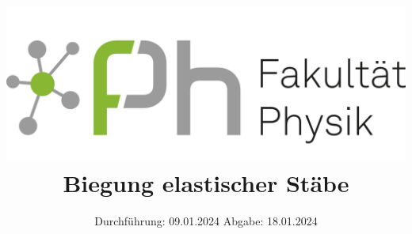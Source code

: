 

\subject{V103}
\title{\includegraphics[scale=0.1]{../Logo.png}
Biegung elastischer Stäbe}
\date{%
  Durchführung: 09.01.2024
  \hspace{3em}
  Abgabe: 18.01.2024
}



\maketitle
\thispagestyle{empty}
\tableofcontents
\newpage






\printbibliography{}


